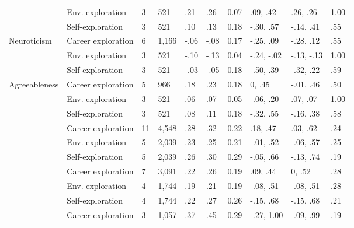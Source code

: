 \begin{table}[ht]
\begin{tabular}{llllllllll}
   & \hspace{0.8em}Env. exploration & 3 & 521 & .21 & .26 & 0.07 & .09, .42 & .26, .26 & 1.00 \\ 
   & \hspace{0.8em}Self-exploration & 3 & 521 & .10 & .13 & 0.18 & -.30, .57 & -.14, .41 & .55 \\ 
  Neuroticism & Career exploration & 6 & 1,166 & -.06 & -.08 & 0.17 & -.25, .09 & -.28, .12 & .55 \\ 
   & \hspace{0.8em}Env. exploration & 3 & 521 & -.10 & -.13 & 0.04 & -.24, -.02 & -.13, -.13 & 1.00 \\ 
   & \hspace{0.8em}Self-exploration & 3 & 521 & -.03 & -.05 & 0.18 & -.50, .39 & -.32, .22 & .59 \\ 
  Agreeableness & Career exploration & 5 & 966 & .18 & .23 & 0.18 & 0, .45 & -.01, .46 & .50 \\ 
   & \hspace{0.8em}Env. exploration & 3 & 521 & .06 & .07 & 0.05 & -.06, .20 & .07, .07 & 1.00 \\ 
   & \hspace{0.8em}Self-exploration & 3 & 521 & .08 & .11 & 0.18 & -.32, .55 & -.16, .38 & .58 \\ 
   & Career exploration & 11 & 4,548 & .28 & .32 & 0.22 & .18, .47 & .03, .62 & .24 \\ 
   & \hspace{0.8em}Env. exploration & 5 & 2,039 & .23 & .25 & 0.21 & -.01, .52 & -.06, .57 & .25 \\ 
   & \hspace{0.8em}Self-exploration & 5 & 2,039 & .26 & .30 & 0.29 & -.05, .66 & -.13, .74 & .19 \\ 
   & Career exploration & 7 & 3,091 & .22 & .26 & 0.19 & .09, .44 & 0, .52 & .28 \\ 
   & \hspace{0.8em}Env. exploration & 4 & 1,744 & .19 & .21 & 0.19 & -.08, .51 & -.08, .51 & .28 \\ 
   & \hspace{0.8em}Self-exploration & 4 & 1,744 & .22 & .27 & 0.26 & -.15, .68 & -.15, .68 & .21 \\ 
   & Career exploration & 3 & 1,057 & .37 & .45 & 0.29 & -.27, 1.00 & -.09, .99 & .19 \\ 

\end{tabular}
\end{table}
